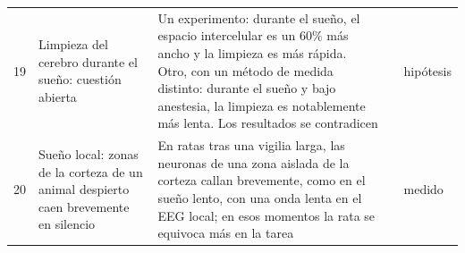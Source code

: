 {\begin{longtable}{>{\raggedright}p{0.5cm}>{\raggedright}p{4.0cm}>{\raggedright}p{5.6cm}>{\raggedright}p{2.3cm}>{\raggedright\arraybackslash}p{1.7cm}}
19 & Limpieza del cerebro durante el sueño: cuestión abierta & Un experimento: durante el sueño, el espacio intercelular es un $60\%$ más ancho y la limpieza es más rápida. Otro, con un método de medida distinto: durante el sueño y bajo anestesia, la limpieza es notablemente más lenta. Los resultados se contradicen & \cite{Xie2013,Miao2024} & hipótesis \\
20 & Sueño local: zonas de la corteza de un animal despierto caen brevemente en silencio & En ratas tras una vigilia larga, las neuronas de una zona aislada de la corteza callan brevemente, como en el sueño lento, con una onda lenta en el EEG local; en esos momentos la rata se equivoca más en la tarea & \cite{Vyazovskiy2011} & medido \\
\bottomrule
\end{longtable}}
